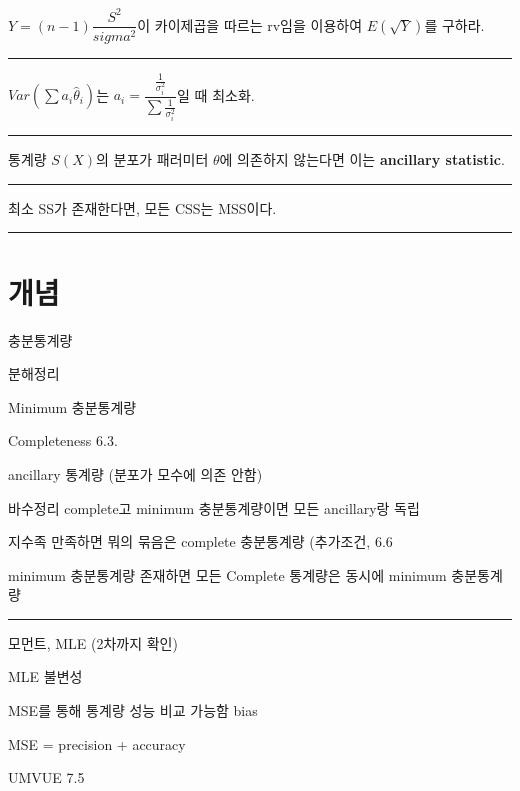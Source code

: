 \documentclass[
]{book}
\begin{document}
\(Y=(n-1)\dfrac{S^2}{sigma^2}\)이 카이제곱을 따르는 rv임을 이용하여 \(E(\sqrt{Y})\)를 구하라.

\begin{center}\rule{0.5\linewidth}{0.5pt}\end{center}

\(Var \left( \sum a_i \hat \theta_i \right)\)는 \(a_i = \dfrac{\tfrac{1}{\sigma^2_i}}{\sum \tfrac{1}{\sigma^2_i}}\)일 때 최소화.

\begin{center}\rule{0.5\linewidth}{0.5pt}\end{center}

통계량 \(S(X)\)의 분포가 패러미터 \(\theta\)에 의존하지 않는다면 이는 \textbf{ancillary statistic}.

\begin{center}\rule{0.5\linewidth}{0.5pt}\end{center}

최소 SS가 존재한다면, 모든 CSS는 MSS이다.

\begin{center}\rule{0.5\linewidth}{0.5pt}\end{center}

\hypertarget{uxac1cuxb150}{%
\section{개념}\label{uxac1cuxb150}}

충분통계량

분해정리

Minimum 충분통계량

Completeness 6.3.

ancillary 통계량 (분포가 모수에 의존 안함)

바수정리 complete고 minimum 충분통계량이면 모든 ancillary랑 독립

지수족 만족하면 뭐의 묶음은 complete 충분통계량 (추가조건, 6.6

minimum 충분통계량 존재하면 모든 Complete 통계량은 동시에 minimum 충분통계량

\begin{center}\rule{0.5\linewidth}{0.5pt}\end{center}

모먼트, MLE (2차까지 확인)

MLE 불변성

MSE를 통해 통계량 성능 비교 가능함
bias

MSE = precision + accuracy

UMVUE 7.5
\end{document}
